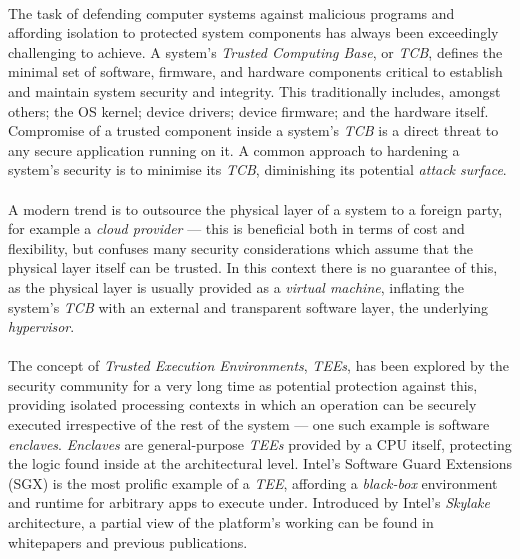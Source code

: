 


\paragraph{} The task of defending computer systems against malicious programs and affording isolation to protected system components has always been exceedingly challenging to achieve. A system's \textit{Trusted Computing Base}, or \textit{TCB}, defines the minimal set of software, firmware, and hardware components critical to establish and maintain system security and integrity. This traditionally includes, amongst others; the OS kernel; device drivers; device firmware; and the hardware itself. Compromise of a trusted component inside a system's \textit{TCB} is a direct threat to any secure application running on it. A common approach to hardening a system's security is to minimise its \textit{TCB}, diminishing its potential \textit{attack surface}. 

\paragraph{} A modern trend is to outsource the physical layer of a system to a foreign party, for example a \textit{cloud provider} --- this is beneficial both in terms of cost and flexibility, but confuses many security considerations which assume that the physical layer itself can be trusted. In this context there is no guarantee of this, as the physical layer is usually provided as a \textit{virtual machine}, inflating the system's \textit{TCB} with an external and transparent software layer, the underlying \textit{hypervisor}.

\paragraph{} The concept of \textit{Trusted Execution Environments}, \textit{TEEs}, has been explored by the security community for a very long time as potential protection against this, providing isolated processing contexts in which an operation can be securely executed irrespective of the rest of the system --- one such example is software \textit{enclaves}. \textit{Enclaves} are general-purpose \textit{TEEs} provided by a CPU itself, protecting the logic found inside at the architectural level. Intel's Software Guard Extensions (SGX) is the most prolific example of a \textit{TEE}, affording a \textit{black-box} environment and runtime for arbitrary apps to execute under. Introduced by Intel's \textit{Skylake} architecture, a partial view of the platform's working can be found in whitepapers and previous publications.

